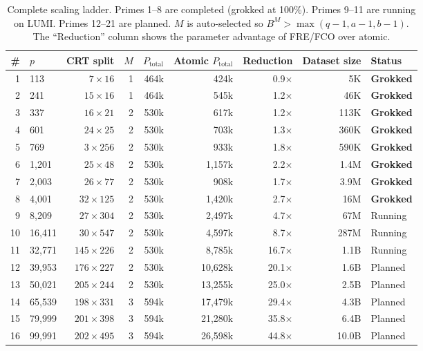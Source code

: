 \documentclass[11pt]{article}
\newcommand{\Ptotal}{P_{\mathrm{total}}}
\begin{document}
\begin{table}[t]
\centering
\small
\caption{Complete scaling ladder. Primes 1--8 are completed (grokked at 100\%). Primes 9--11 are running on LUMI. Primes 12--21 are planned. $M$ is auto-selected so $B^M > \max(q-1, a-1, b-1)$. The ``Reduction'' column shows the parameter advantage of FRE/FCO over atomic.}
\label{tab:scaling_plan}
\begin{tabular}{rlrrrrrrl}
\toprule
\# & $p$ & CRT split & $M$ & $\Ptotal$ & Atomic $\Ptotal$ & Reduction & Dataset size & Status \\
\midrule
1 & 113 & $7 \times 16$ & 1 & 464k & 424k & 0.9$\times$ & 5K & \textbf{Grokked} \\
2 & 241 & $15 \times 16$ & 1 & 464k & 545k & 1.2$\times$ & 46K & \textbf{Grokked} \\
3 & 337 & $16 \times 21$ & 2 & 530k & 617k & 1.2$\times$ & 113K & \textbf{Grokked} \\
4 & 601 & $24 \times 25$ & 2 & 530k & 703k & 1.3$\times$ & 360K & \textbf{Grokked} \\
5 & 769 & $3 \times 256$ & 2 & 530k & 933k & 1.8$\times$ & 590K & \textbf{Grokked} \\
6 & 1,201 & $25 \times 48$ & 2 & 530k & 1,157k & 2.2$\times$ & 1.4M & \textbf{Grokked} \\
7 & 2,003 & $26 \times 77$ & 2 & 530k & 908k & 1.7$\times$ & 3.9M & \textbf{Grokked} \\
8 & 4,001 & $32 \times 125$ & 2 & 530k & 1,420k & 2.7$\times$ & 16M & \textbf{Grokked} \\
\midrule
9 & 8,209 & $27 \times 304$ & 2 & 530k & 2,497k & 4.7$\times$ & 67M & Running \\
10 & 16,411 & $30 \times 547$ & 2 & 530k & 4,597k & 8.7$\times$ & 287M & Running \\
11 & 32,771 & $145 \times 226$ & 2 & 530k & 8,785k & 16.7$\times$ & 1.1B & Running \\
\midrule
12 & 39,953 & $176 \times 227$ & 2 & 530k & 10,628k & 20.1$\times$ & 1.6B & Planned \\
13 & 50,021 & $205 \times 244$ & 2 & 530k & 13,255k & 25.0$\times$ & 2.5B & Planned \\
14 & 65,539 & $198 \times 331$ & 3 & 594k & 17,479k & 29.4$\times$ & 4.3B & Planned \\
15 & 79,999 & $201 \times 398$ & 3 & 594k & 21,280k & 35.8$\times$ & 6.4B & Planned \\
16 & 99,991 & $202 \times 495$ & 3 & 594k & 26,598k & 44.8$\times$ & 10.0B & Planned \\

\end{tabular}
\end{table}
\end{document}
